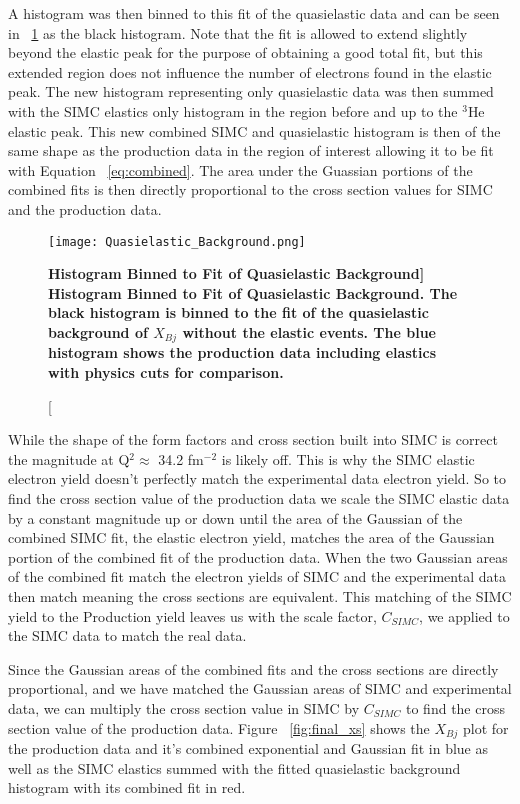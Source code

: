 A histogram was then binned to this fit of the quasielastic data and can be seen in ~\ref{fig:QE_background} as the black histogram. Note that the fit is allowed to extend slightly beyond the elastic peak for the purpose of obtaining a good total fit, but this extended region does not influence the number of electrons found in the elastic peak. The new histogram representing only quasielastic data was then summed with the SIMC elastics only histogram in the region before and up to the $^3$He elastic peak. This new combined SIMC and quasielastic histogram is then of the same shape as the production data in the region of interest allowing it to be fit with Equation ~\ref{eq:combined}. The area under the Guassian portions of the combined fits is then directly proportional to the cross section values for SIMC and the production data. 

\begin{figure}[!ht]
\begin{center}
\texttt{[image: Quasielastic\_Background.png]}
\end{center}
\caption[\bf{Histogram Binned to Fit of Quasielastic Background}]{
{\bf{Histogram Binned to Fit of Quasielastic Background.}} The black histogram is binned to the fit of the quasielastic background of $X_{Bj}$ without the elastic events. The blue histogram shows the production data including elastics with physics cuts for comparison.}
\label{fig:QE_background}
\end{figure}

While the shape of the form factors and cross section built into SIMC is correct the magnitude at Q$^2 \approx$ 34.2 fm$^{-2}$ is likely off. This is why the SIMC elastic electron yield doesn't perfectly match the experimental data electron yield. So to find the cross section value of the production data we scale the SIMC elastic data by a constant magnitude up or down until the area of the Gaussian of the combined SIMC fit, the elastic electron yield, matches the area of the Gaussian portion of the combined fit of the production data. When the two Gaussian areas of the combined fit match the electron yields of SIMC and the experimental data then match meaning the cross sections are equivalent. This matching of the SIMC yield to the Production yield leaves us with the scale factor, $C_{SIMC}$, we applied to the SIMC data to match the real data. 

Since the Gaussian areas of the combined fits and the cross sections are directly proportional, and we have matched the Gaussian areas of SIMC and experimental data, we can multiply the cross section value in SIMC by $C_{SIMC}$ to find the cross section value of the production data. Figure ~\ref{fig:final_xs} shows the $X_{Bj}$ plot for the production data and it's combined exponential and Gaussian fit in blue as well as the SIMC elastics summed with the fitted quasielastic background histogram with its combined fit in red. 

